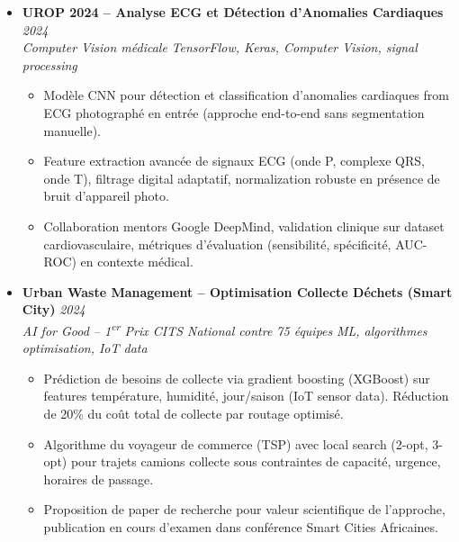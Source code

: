 \documentclass[a4paper,11pt]{article}
\begin{document}
\begin{itemize}[leftmargin=*, label={-}]
\item \textbf{UROP 2024 -- Analyse ECG et D\'etection d'Anomalies Cardiaques} \hfill \textit{2024} \\
\textit{Computer Vision m\'edicale} \hfill \textit{TensorFlow, Keras, Computer Vision, signal processing}
\vspace{-2pt}
    \begin{itemize}[leftmargin=0.4cm, nosep, label=\tiny$\bullet$]
        \item \small{Mod\`ele CNN pour d\'etection et classification d'anomalies cardiaques from ECG photograph\'e en entr\'ee (approche end-to-end sans segmentation manuelle).}
        \item \small{Feature extraction avanc\'ee de signaux ECG (onde P, complexe QRS, onde T), filtrage digital adaptatif, normalization robuste en pr\'esence de bruit d'appareil photo.}
        \item \small{Collaboration mentors Google DeepMind, validation clinique sur dataset cardiovasculaire, m\'etriques d'\'evaluation (sensibilit\'e, sp\'ecificit\'e, AUC-ROC) en contexte m\'edical.}
    \end{itemize}
\vspace{3pt}

\item \textbf{Urban Waste Management -- Optimisation Collecte D\'echets (Smart City)} \hfill \textit{2024} \\
\textit{AI for Good -- 1\textsuperscript{er} Prix CITS National contre 75 \'equipes} \hfill \textit{ML, algorithmes optimisation, IoT data}
\vspace{-2pt}
    \begin{itemize}[leftmargin=0.4cm, nosep, label=\tiny$\bullet$]
        \item \small{Pr\'ediction de besoins de collecte via gradient boosting (XGBoost) sur features temp\'erature, humidit\'e, jour/saison (IoT sensor data). R\'eduction de 20\% du co\^ut total de collecte par routage optimis\'e.}
        \item \small{Algorithme du voyageur de commerce (TSP) avec local search (2-opt, 3-opt) pour trajets camions collecte sous contraintes de capacit\'e, urgence, horaires de passage.}
        \item \small{Proposition de paper de recherche pour valeur scientifique de l'approche, publication en cours d'examen dans conf\'erence Smart Cities Africaines.}
    \end{itemize}
\vspace{3pt}


\end{itemize}
\end{document}
